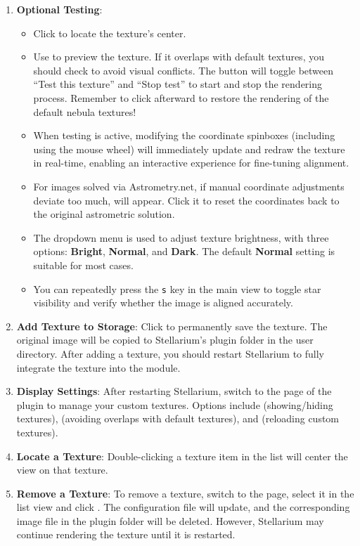 \begin{enumerate}
    \item \textbf{Optional Testing}:
    \begin{itemize}
        \item Click  to locate the texture's center.
        \item Use  to preview the texture. If it overlaps with default textures, you should check  to avoid visual conflicts. 
		The  button will toggle between ``Test this texture'' and ``Stop test'' to start and stop the rendering process. 
		Remember to click  afterward to restore the rendering of the default nebula textures! 
        \item When testing is active, modifying the coordinate spinboxes (including using the mouse wheel) will immediately update and redraw the texture in real-time, enabling an interactive experience for fine-tuning alignment.
        \item For images solved via Astrometry.net, if manual coordinate adjustments deviate too much,  will appear. Click it to reset the coordinates back to the original astrometric solution.
        \item The dropdown menu is used to adjust texture brightness, with three options: \textbf{Bright}, \textbf{Normal}, and \textbf{Dark}. 
		The default \textbf{Normal} setting is suitable for most cases.
        \item You can repeatedly press the \texttt{s} key in the main view to toggle star visibility and verify whether the image is aligned accurately.
    \end{itemize}

    \item \textbf{Add Texture to Storage}: Click  to permanently save 
	the texture. The original image will be copied to Stellarium's plugin folder in the user 
	directory. After adding a texture, you should restart Stellarium to fully integrate the texture into the module.

    \item \textbf{Display Settings}: After restarting Stellarium, switch to the  page of the 
	plugin to manage your custom textures. Options include  (showing/hiding textures),  (avoiding 
	overlaps with default textures), and  (reloading custom textures).

    \item \textbf{Locate a Texture}: Double-clicking a texture item in the list will center the view on that texture.

    \item \textbf{Remove a Texture}: To remove a texture, switch to the  page, select it in 
	the list view and click . The configuration file 
	will update, and the corresponding image file in the plugin folder will be deleted. However, 
	Stellarium may continue rendering the texture until it is restarted.
\end{enumerate}

